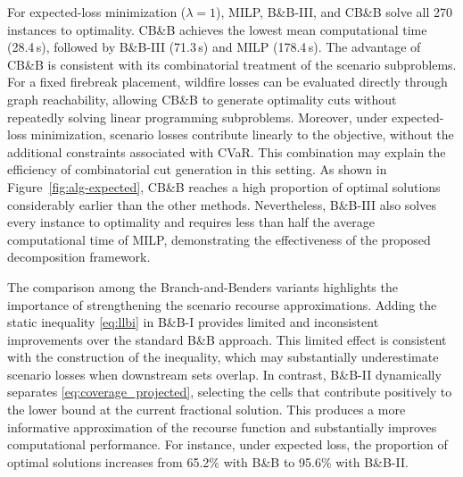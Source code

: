 \documentclass[a4paper,fleqn]{cas-sc}
\begin{document}
For expected-loss minimization ($\lambda=1$), MILP, B\&B-III, and CB\&B
solve all 270 instances to optimality. CB\&B achieves the lowest mean
computational time (28.4\,s), followed by B\&B-III (71.3\,s) and MILP
(178.4\,s). The advantage of CB\&B is consistent with its combinatorial
treatment of the scenario subproblems. For a fixed firebreak placement,
wildfire losses can be evaluated directly through graph reachability,
allowing CB\&B to generate optimality cuts without repeatedly solving
linear programming subproblems. Moreover, under expected-loss
minimization, scenario losses contribute linearly to the objective,
without the additional constraints associated with CVaR. This
combination may explain the efficiency of combinatorial cut generation
in this setting. As shown in Figure~\ref{fig:alg-expected},
CB\&B reaches a high proportion of optimal solutions considerably
earlier than the other methods. Nevertheless, B\&B-III also solves
every instance to optimality and requires less than half the average
computational time of MILP, demonstrating the effectiveness of the
proposed decomposition framework.

The comparison among the Branch-and-Benders variants highlights the
importance of strengthening the scenario recourse approximations.
Adding the static inequality \eqref{eq:llbi} in
B\&B-I provides limited and inconsistent improvements
over the standard B\&B approach. This limited effect is consistent
with the construction of the inequality, which may substantially
underestimate scenario losses when downstream sets overlap.
In contrast, B\&B-II dynamically separates
\eqref{eq:coverage_projected}, selecting the cells that contribute
positively to the lower bound at the current fractional solution.
This produces a more informative approximation of the recourse
function and substantially improves computational performance.
For instance, under expected loss, the proportion of optimal
solutions increases from 65.2\% with B\&B to 95.6\% with B\&B-II.
\end{document}
